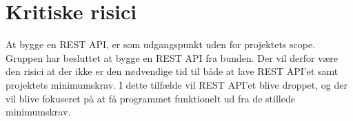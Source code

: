 \section{Kritiske risici}
At bygge en REST API, er som udgangspunkt uden for projektets scope. Gruppen har besluttet at bygge en REST API fra bunden. Der vil derfor være den risici at der ikke er den nødvendige tid til både at lave REST API’et samt projektets minimumskrav. I dette tilfælde vil REST API’et blive droppet, og der vil blive fokuseret på at få programmet funktionelt ud fra de stillede minimumskrav. 